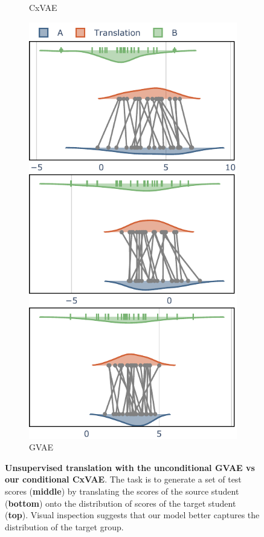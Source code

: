 \documentclass[nohyperref]{article}
\theoremstyle{plain}
\theoremstyle{definition}
\theoremstyle{remark}
\begin{document}
\begin{figure}[t]
\begin{center}
\begin{subfigure}{0.49\columnwidth}
    \caption{CxVAE}
\end{subfigure}
\hfill
\begin{subfigure}{0.49\columnwidth}
    \includegraphics[width=\textwidth]{files/trans_theirs.pdf}
    \caption{GVAE}
\end{subfigure}
    \caption{\textbf{Unsupervised translation with the unconditional GVAE vs our conditional CxVAE}.  The task is to generate a set of test scores (\textbf{middle}) by translating the scores of the source student (\textbf{bottom}) onto the distribution of scores of the target student (\textbf{top}).  Visual inspection suggests that our model better captures the distribution of the target group.}
    \label{fig:trans}
    \end{center}
    \vskip -0.2in
\end{figure}
\end{document}
